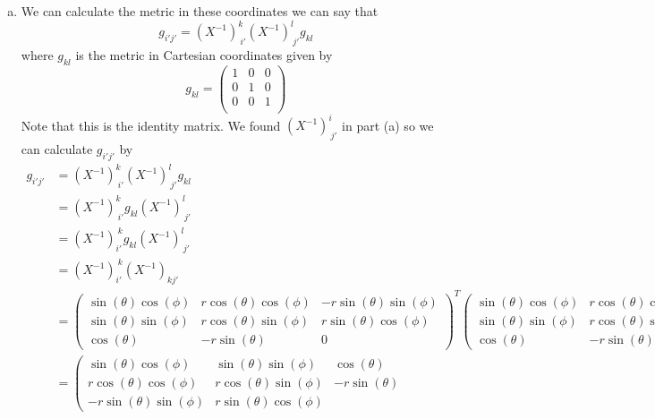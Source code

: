 \documentclass[11pt]{article}
\numberwithin{equation}{section}
\begin{document}
\begin{enumerate}[(a)]
\item
We can calculate the metric in these coordinates we can say that
$$g_{i'j'} = (X^{-1})^{k}_{\ i'}(X^{-1})^{l}_{\ j'}g_{kl}$$
where $g_{kl}$ is the metric in Cartesian coordinates given by
$$g_{kl} = \left(\begin{array}{ccc}
		1	&0	&0\\
		0	&1	&0\\
		0	&0	&1\\
		\end{array}\right)$$
Note that this is the identity matrix. We found $(X^{-1})^{i}_{\ j'}$ in part (a) so we can calculate $g_{i'j'}$ by
\begin{align*}
g_{i'j'} &= (X^{-1})^{k}_{\ i'}(X^{-1})^{l}_{\ j'}g_{kl}\\
&= (X^{-1})^{k}_{\ i'}g_{kl}(X^{-1})^{l}_{\ j'}\\
&= (X^{-1})^{\ k}_{i'}g_{kl}(X^{-1})^{l}_{\ j'}\\
&= (X^{-1})^{\ k}_{i'}(X^{-1})_{k j'}\\
&= \left(\begin{array}{ccc}
\scriptstyle{\sin(\theta)\cos(\phi)}
	&\scriptstyle{r\cos(\theta)\cos(\phi)}	
	&\scriptstyle{-r\sin(\theta)\sin(\phi)}\\
\scriptstyle{ \sin(\theta)\sin(\phi)}	
	&\scriptstyle{r\cos(\theta)\sin(\phi)}
	&\scriptstyle{r\sin(\theta)\cos(\phi)}\\	
\scriptstyle{\cos(\theta)}
	&\scriptstyle{-r\sin(\theta)}
	&\scriptstyle{0}
	\end{array}\right)^T
\left(\begin{array}{ccc}
\scriptstyle{\sin(\theta)\cos(\phi)}	
	&\scriptstyle{r\cos(\theta)\cos(\phi)}
	&\scriptstyle{-r\sin(\theta)\sin(\phi)}\\
\scriptstyle{\sin(\theta)\sin(\phi)}
	&\scriptstyle{r\cos(\theta)\sin(\phi)}
	&\scriptstyle{r\sin(\theta)\cos(\phi)}\\	
\scriptstyle{\cos(\theta)}
	&\scriptstyle{-r\sin(\theta)}
	&\scriptstyle{0}
	\end{array}\right)\\
&= \left(\begin{array}{ccc}
\scriptstyle{\sin(\theta)\cos(\phi)}
	&\scriptstyle{ \sin(\theta)\sin(\phi)}	
	&\scriptstyle{\cos(\theta)}\\
\scriptstyle{r\cos(\theta)\cos(\phi)}	
	&\scriptstyle{r\cos(\theta)\sin(\phi)}
	&\scriptstyle{-r\sin(\theta)}\\
\scriptstyle{-r\sin(\theta)\sin(\phi)}
	&\scriptstyle{r\sin(\theta)\cos(\phi)}	

\end{array}
\end{align*}
\end{enumerate}
\end{document}

